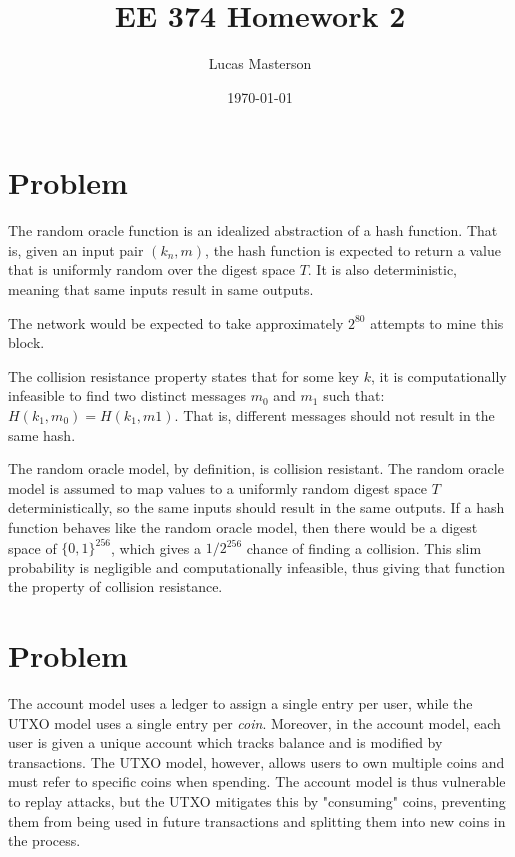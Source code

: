\documentclass[11pt]{article}
\title{EE 374 Homework 2}
\author{Lucas Masterson}
\date{\today}
\begin{document}
\maketitle


\section{Problem}

\begin{p}\end{p}
The random oracle function is an idealized abstraction of a hash function. That is, given an input pair $(k_n, m)$, the hash function is expected to return a value that is uniformly random over the digest space $T$. It is also deterministic, meaning that same inputs result in same outputs.

\begin{p}\end{p}
The network would be expected to take approximately $2^{80}$ attempts to mine this block.

\begin{p}\end{p}
The collision resistance property states that for some key $k$, it is computationally infeasible to find two distinct messages $m_0$ and $m_1$ such that: $H(k_1, m_0) = H(k_1, m1)$. That is, different messages should not result in the same hash.

\begin{p}\end{p}
The random oracle model, by definition, is collision resistant. The random oracle model is assumed to map values to a uniformly random digest space $T$ deterministically, so the same inputs should result in the same outputs. If a hash function behaves like the random oracle model, then there would be a digest space of $\{0,1\}^{256}$, which gives a $1/2^{256}$ chance of finding a collision. This slim probability is negligible and computationally infeasible, thus giving that function the property of collision resistance.


\section{Problem}
The account model uses a ledger to assign a single entry per user, while the UTXO model uses a single entry per \textit{coin}. Moreover, in the account model, each user is given a unique account which tracks balance and is modified by transactions. The UTXO model, however, allows users to own multiple coins and must refer to specific coins when spending. The account model is thus vulnerable to replay attacks, but the UTXO mitigates this by "consuming" coins, preventing them from being used in future transactions and splitting them into new coins in the process.
\end{document}
